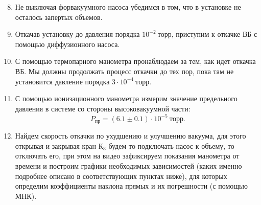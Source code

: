\documentclass[a4paper,12pt]{article}
\theoremstyle{definition}
\begin{document}
	\begin{enumerate}
		\setcounter{enumi}{7}
		
		\item Не выключая форвакуумного насоса убедимся в том, что в установке не осталось запертых объемов. 
		
		\item Откачав установку до давления порядка $ 10^{-2}~торр$, приступим к откачке ВБ с помощью диффузионного насоса. 
		
		
		\item С помощью термопарного манометра пронаблюдаем за тем, как идет откачка ВБ. Мы должны продолжать процесс откачки до тех пор, пока там не установится давление порядка $3 \cdot 10^{-4}~торр.$ 
		
		\item С помощью ионизационного манометра измерим значение предельного давления в системе со стороны высоковакуумной части: $$P_{пр} = (6.1 \pm 0.1)  \cdot 10^{-5} ~торр.$$
		
		
		\item Найдем скорость откачки по ухудшению и улучшению вакуума, для этого открывая и закрывая кран $К_3$ будем то подключать насос к объему, то отключать его, при этом на видео зафиксируем показания манометра от времени и построим графики необходимых  зависимостей (каких именно подробнее описано в соответствующих пунктах ниже), для которых определим коэффициенты наклона прямых и их погрешности (с помощью МНК).
		

\end{enumerate}
\end{document}
